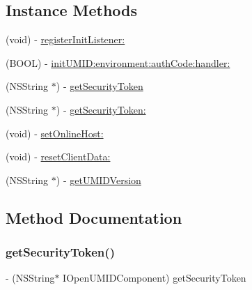 \subsection*{Instance Methods}
\begin{DoxyCompactItemize}
\item 
(void) -\/ \mbox{\hyperlink{protocol_i_open_u_m_i_d_component_01-p_a863a2ebe56b81d8523ae881c6521af6b}{register\+Init\+Listener\+:}}
\item 
(B\+O\+OL) -\/ \mbox{\hyperlink{protocol_i_open_u_m_i_d_component_01-p_ab8b891892a5d25fac9dc0aaf6c937e18}{init\+U\+M\+I\+D\+:environment\+:auth\+Code\+:handler\+:}}
\item 
(N\+S\+String $\ast$) -\/ \mbox{\hyperlink{protocol_i_open_u_m_i_d_component_01-p_a09ce1246774fc70ead4a86e450fd7d73}{get\+Security\+Token}}
\item 
(N\+S\+String $\ast$) -\/ \mbox{\hyperlink{protocol_i_open_u_m_i_d_component_01-p_aec10b3ad4633ae24d4970031cc6424ea}{get\+Security\+Token\+:}}
\item 
(void) -\/ \mbox{\hyperlink{protocol_i_open_u_m_i_d_component_01-p_a566a947de77796e00a566f76bd997a94}{set\+Online\+Host\+:}}
\item 
(void) -\/ \mbox{\hyperlink{protocol_i_open_u_m_i_d_component_01-p_a7690ec941a6f7877ea574bff0a0b88f6}{reset\+Client\+Data\+:}}
\item 
(N\+S\+String $\ast$) -\/ \mbox{\hyperlink{protocol_i_open_u_m_i_d_component_01-p_a076c29135560130eb1ed1061b4ba6311}{get\+U\+M\+I\+D\+Version}}
\end{DoxyCompactItemize}


\subsection{Method Documentation}
\mbox{\label{protocol_i_open_u_m_i_d_component_01-p_a09ce1246774fc70ead4a86e450fd7d73}} 
\subsubsection{\texorpdfstring{get\+Security\+Token()}{getSecurityToken()}}
{\footnotesize\ttfamily -\/ (N\+S\+String$\ast$ I\+Open\+U\+M\+I\+D\+Component) get\+Security\+Token \begin{DoxyParamCaption}{ }\end{DoxyParamCaption}}

